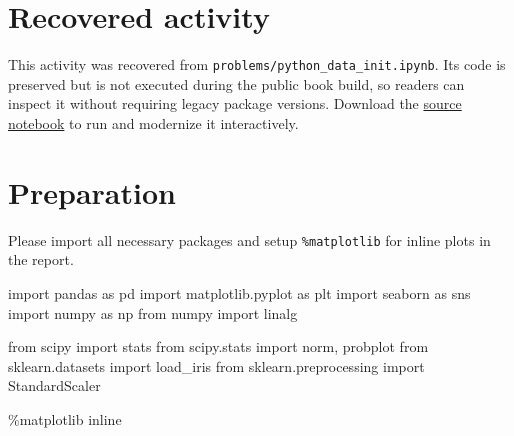 \documentclass[
  letterpaper,
]{scrbook}
\newenvironment{Shaded}{\begin{snugshade}}{\end{snugshade}}
\newcommand{\ImportTok}[1]{\textcolor[rgb]{0.00,0.46,0.62}{#1}}
\newcommand{\NormalTok}[1]{\textcolor[rgb]{0.00,0.23,0.31}{#1}}
\newcommand{\OperatorTok}[1]{\textcolor[rgb]{0.37,0.37,0.37}{#1}}
\begin{document}
\section*{Recovered
activity}\label{sec-lab-data-initialization-assignment}


\begin{tcolorbox}[enhanced jigsaw, arc=.35mm, bottomrule=.15mm, bottomtitle=1mm, breakable, colback=white, colbacktitle=quarto-callout-note-color!10!white, colframe=quarto-callout-note-color-frame, coltitle=black, left=2mm, leftrule=.75mm, opacityback=0, opacitybacktitle=0.6, rightrule=.15mm, title=\textcolor{quarto-callout-note-color}{\faInfo}\hspace{0.5em}{Historical source and execution note}, titlerule=0mm, toprule=.15mm, toptitle=1mm]

This activity was recovered from
\texttt{problems/python\_data\_init.ipynb}. Its code is preserved but is
not executed during the public book build, so readers can inspect it
without requiring legacy package versions. Download the
\href{../notebooks/data-initialization-assignment.ipynb}{source
notebook} to run and modernize it interactively.

\end{tcolorbox}

\section*{Preparation}\label{preparation}


Please import all necessary packages and setup \texttt{\%matplotlib} for
inline plots in the report.

\begin{Shaded}
\begin{Highlighting}[]
\ImportTok{import}\NormalTok{ pandas }\ImportTok{as}\NormalTok{ pd}
\ImportTok{import}\NormalTok{ matplotlib.pyplot }\ImportTok{as}\NormalTok{ plt}
\ImportTok{import}\NormalTok{ seaborn }\ImportTok{as}\NormalTok{ sns}
\ImportTok{import}\NormalTok{ numpy }\ImportTok{as}\NormalTok{ np}
\ImportTok{from}\NormalTok{ numpy }\ImportTok{import}\NormalTok{ linalg}

\ImportTok{from}\NormalTok{ scipy }\ImportTok{import}\NormalTok{ stats}
\ImportTok{from}\NormalTok{ scipy.stats }\ImportTok{import}\NormalTok{ norm, probplot}
\ImportTok{from}\NormalTok{ sklearn.datasets }\ImportTok{import}\NormalTok{ load\_iris}
\ImportTok{from}\NormalTok{ sklearn.preprocessing }\ImportTok{import}\NormalTok{ StandardScaler}


\OperatorTok{\%}\NormalTok{matplotlib inline}
\end{Highlighting}
\end{Shaded}
\end{document}

